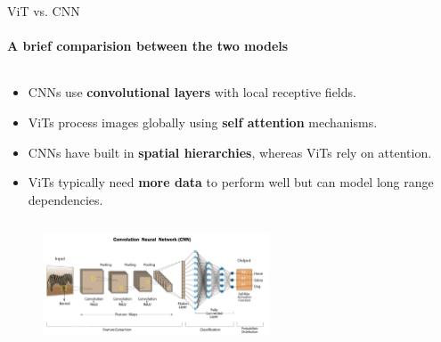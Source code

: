 \begin{frame}[fragile]{ViT vs. CNN}
  \framesubtitle{A brief comparision between the two models}
  \begin{columns}
    \begin{column}{\textwidth}
      \begin{itemize}
        \item CNNs use \textbf{convolutional layers} with local receptive fields.
        \item ViTs process images globally using \textbf{self attention} mechanisms.
        \item CNNs have built in \textbf{spatial hierarchies}, whereas ViTs rely on attention.
        \item ViTs typically need \textbf{more data} to perform well but can model long range dependencies.
      \end{itemize}
    \end{column}
  \end{columns}
  \begin{figure}
    \includegraphics[width=0.6\textwidth]{images/cnn_architecture.png}
  \end{figure}
\end{frame}